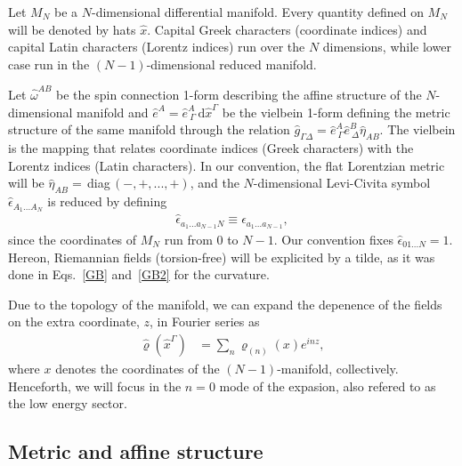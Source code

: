 \documentclass[aps,prd,12pt,superscriptaddress,showpacs,showkeys,longbibliography,reprint,nofootinbib]{revtex4-1}
\begin{document}
Let $M_N$ be a $N$-dimensional differential manifold. Every quantity defined on $M_N$ will be denoted by hats $\hat{x}$. Capital Greek characters (coordinate indices) and capital Latin characters (Lorentz indices) run over the $N$ dimensions, while lower case run in the $(N-1)$-dimensional reduced manifold.

Let $\hat{\omega}^{AB}$ be the spin connection 1-form describing the affine structure of the $N$-dimensional manifold and $\hat{e}^A=\hat{e}^{A}_{\ \Gamma}\,\text{d}\hat{x}^\Gamma$ be the vielbein 1-form defining the metric structure of the same manifold through the relation $\hat{g}_{\Gamma\Delta}=\hat{e}^{A}_{\ \Gamma}\hat{e}^{B}_{\ \Delta}\hat{\eta}_{AB}$. The vielbein is the mapping that relates coordinate indices (Greek characters) with the Lorentz indices (Latin characters). In our convention, the flat Lorentzian metric will be $\hat{\eta}_{AB}=\,$diag$\,(-,+,...,+)$, and the $N$-dimensional Levi-Civita symbol $\hat{\epsilon}_{A_1...A_N}$ is reduced by defining
\begin{align*}
\hat{\epsilon}_{a_1...a_{N-1}N} \equiv \epsilon_{a_1...a_{N-1}},
\end{align*} 
since the coordinates of $M_N$ run from $0$ to $N-1$. Our convention fixes $\hat{\epsilon}_{01...N}=1$. Hereon, Riemannian fields (torsion-free) will be explicited by a tilde, as it was done in Eqs.~\eqref{GB} and~\eqref{GB2} for the curvature.

Due to the topology of the manifold, we can expand the depenence of the fields on the extra coordinate, $z$, in Fourier series as  
\begin{align}\label{Fourier}
\hat{\varrho}(\hat{x}^\Gamma)&=\sum_n\varrho_{(n)}(x)e^{in z},
\end{align}
where $x$ denotes the coordinates of the $(N-1)$-manifold, collectively. Henceforth, we will focus in the $n=0$ mode of the expasion, also refered to as the low energy sector.

\subsection{Metric and affine structure}
\end{document}
